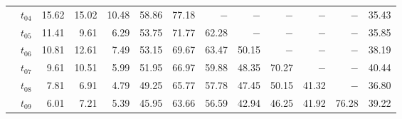\begin{table}[ht]
\begin{tabular}{@{}l l r r r r r r r r r r r@{}}
 & $t_{04}$ & 15.62 & 15.02 & 10.48 & 58.86 & 77.18 & $-$ & $-$ & $-$ & $-$ & $-$ & 35.43 \\
 & $t_{05}$ & 11.41 & 9.61 & 6.29 & 53.75 & 71.77 & 62.28 & $-$ & $-$ & $-$ & $-$ & 35.85 \\
 & $t_{06}$ & 10.81 & 12.61 & 7.49 & 53.15 & 69.67 & 63.47 & 50.15 & $-$ & $-$ & $-$ & 38.19 \\
 & $t_{07}$ & 9.61 & 10.51 & 5.99 & 51.95 & 66.97 & 59.88 & 48.35 & 70.27 & $-$ & $-$ & 40.44 \\
 & $t_{08}$ & 7.81 & 6.91 & 4.79 & 49.25 & 65.77 & 57.78 & 47.45 & 50.15 & 41.32 & $-$ & 36.80 \\
 & $t_{09}$ & 6.01 & 7.21 & 5.39 & 45.95 & 63.66 & 56.59 & 42.94 & 46.25 & 41.92 & 76.28 & 39.22 \\
\bottomrule
\end{tabular}
\end{table}
